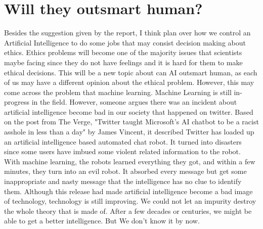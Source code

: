 \documentclass[12pt]{article}
\begin{document}
\section{Will they outsmart human?}
Besides the suggestion given by the report, I think plan over how we control an Artificial Intelligence to do some jobs that may consist decision making about ethics. Ethics problems will become one of the majority issues that scientists maybe facing since they do not have feelings and it is hard for them to make ethical decisions. This will be a new topic about can AI outsmart human, as each of us may have a different opinion about the ethical problem. However, this may come across the problem that machine learning. Machine Learning is still in-progress in the field. However, someone argues there was an incident about artificial intelligence become bad in our society that happened on twitter. Based on the post from The Verge, "Twitter taught Microsoft's AI chatbot to be a racist asshole in less than a day" by James Vincent, it described Twitter has loaded up an artificial intelligence based automated chat robot\cite{verge}. It turned into disasters since some users have imbued some violent related information to the robot. With machine learning, the robots learned everything they got, and within a few minutes, they turn into an evil robot. It absorbed every message but get some inappropriate and nasty message that the intelligence has no clue to identify them. Although this release had made artificial intelligence become a bad image of technology, technology is still improving. We could not let an impurity destroy the whole theory that is made of. After a few decades or centuries, we might be able to get a better intelligence. But We don't know it by now.
\end{document}
